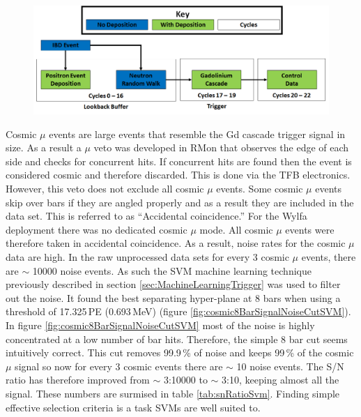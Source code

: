 \begin{figure}[!h]
 \centering
 \includegraphics[width=\linewidth]{Chapter6/Figs/CycleExplaination.png}
 \label{fig:CycleExplaination}
\end{figure}

Cosmic $\mu$ events are large events that resemble the Gd cascade trigger signal in size. As a result a $\mu$ veto was developed in RMon that observes the edge of each side and checks for concurrent hits. If concurrent hits are found then the event is considered cosmic and therefore discarded. This is done via the TFB electronics. However, this veto does not exclude all cosmic $\mu$ events. Some cosmic $\mu$ events skip over bars if they are angled properly and as a result they are included in the data set. This is referred to as ``Accidental coincidence.'' For the Wylfa deployment there was no dedicated cosmic $\mu$ mode. All cosmic $\mu$ events were therefore taken in accidental coincidence. As a result, noise rates for the cosmic $\mu$ data are high. In the raw unprocessed data sets for every 3 cosmic $\mu$ events, there are $\sim$ 10000 noise events. As such the SVM machine learning technique previously described in section \ref{sec:MachineLearningTrigger} was used to filter out the noise. It found the best separating hyper-plane at 8 bars when using a threshold of 17.325\,PE (0.693\,MeV) (figure \ref{fig:cosmic8BarSignalNoiseCutSVM}). In figure \ref{fig:cosmic8BarSignalNoiseCutSVM}  most of the noise is highly concentrated at a low number of bar hits. Therefore, the simple 8 bar cut seems intuitively correct. This cut removes 99.9\,\% of noise and keeps 99\,\% of the cosmic $\mu$ signal so now for every 3 cosmic events there are $\sim$ 10 noise events. The S/N ratio has therefore improved from $\sim$ 3:10000 to $\sim$ 3:10, keeping almost all the signal. These numbers are surmised in table \ref{tab:snRatioSvm}. Finding simple effective selection criteria is a task SVMs are well suited to. 

